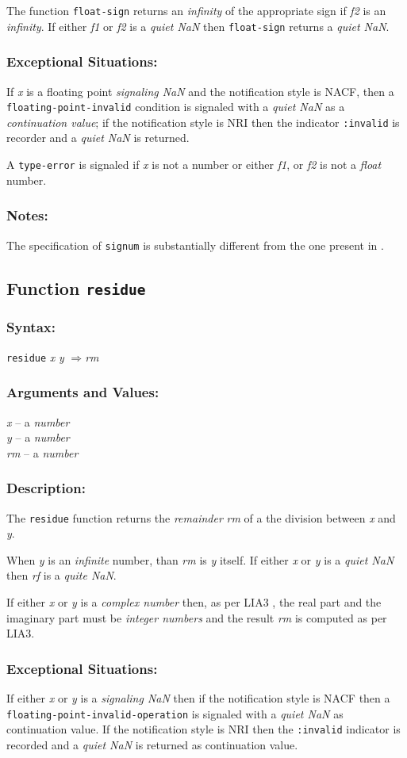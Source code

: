 \documentclass[10pt,fleqn]{article}
\newcommand{\code}[1]{\texttt{#1}}
\newcommand{\clliaterm}[1]{\textit{#1}}
\newcommand{\varname}[1]{\textit{#1}}
\newcommand{\clterm}[1]{\textit{#1}}
\newcommand{\RArrow}{$\Rightarrow$}
\newcommand{\DDictionaryItem}[1]{\vspace*{6pt}\noindent\hrulefill\vspace*{-9pt}\subsection*{#1}}
\newcommand{\DSyntax}{\subsubsection*{Syntax:}}
\newcommand{\DArgsNValues}{\subsubsection*{Arguments and Values:}}
\newcommand{\DDescription}{\subsubsection*{Description:}}
\newcommand{\DExceptional}{\subsubsection*{Exceptional Situations:}}
\newcommand{\DNotes}{\subsubsection*{Notes:}}
\begin{document}
The function \code{float-sign} returns an \clliaterm{infinity} of the
appropriate sign if \varname{f2} is an \clliaterm{infinity}.  If
either \varname{f1} or \varname{f2} is a \clliaterm{quiet NaN} then
\code{float-sign} returns a \clliaterm{quiet NaN}.

\DExceptional{}

If \varname{x} is a floating point \clliaterm{signaling NaN} and the
notification style is NACF, then a\\
\code{floating-point-invalid} condition is signaled with a
\clliaterm{quiet NaN} as a \emph{continuation value}; if the
notification style is NRI then the indicator \code{:invalid} is
recorder and a \clliaterm{quiet NaN} is returned.

A \code{type-error} is signaled if \varname{x} is not a number or
either \varname{f1}, or \varname{f2} is not a \clterm{float} number.


\DNotes{}

The specification of \code{signum} is substantially different from the
one present in \cite{1994:ANSICL}.


\DDictionaryItem{Function \code{residue}}
\index{R!\code{residue}}

\DSyntax{}

\code{residue} \varname{x} \varname {y} \RArrow \varname{rm}

\DArgsNValues{}

\varname{x} -- a \clterm{number}\\
\varname{y} -- a \clterm{number}\\
\varname{rm} -- a \clterm{number}


\DDescription{}

The \code{residue} function returns the \clliaterm{remainder}
\varname{rm} of a the division between \varname{x} and \varname{y}.

When \varname{y} is an \clliaterm{infinite} number, than \varname{rm}
is \varname{y} itself.  If either \varname{x} or \varname{y} is a
\clliaterm{quiet NaN} then \varname{rf} is a \clliaterm{quite NaN}.

If either \varname{x} or \varname{y} is a \clterm{complex number}
then, as per LIA3 \cite{2004:LIA3}, the real part and the imaginary
part must be \clterm{integer numbers} and the result \varname{rm} is
computed as per LIA3.


\DExceptional{}

If either \varname{x} or \varname{y} is a \clliaterm{signaling NaN}
then if the notification style is NACF then a\\
\code{floating-point-invalid-operation} is signaled with a
\clliaterm{quiet NaN} as continuation value.  If the notification
style is NRI then the \code{:invalid} indicator is recorded and a
\clliaterm{quiet NaN} is returned as continuation value.
\end{document}
